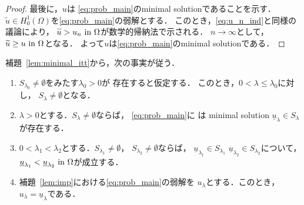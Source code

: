 \begin{proof}
 最後に，$u$は
 \ref{eq:prob_main}のminimal solutionであることを示す．
 $\tilde{u} \in H_0^1(\Omega)$を\ref{eq:prob_main}の弱解とする．
 このとき，\eqref{eq:u_n_ind}と同様の議論により，
 $\widetilde{u} > u_n ~\text{in}~ \Omega$が数学的帰納法で示される．
 $n \to \infty$として，$\widetilde{u} \geq u ~\text{in}~ \Omega$となる．
 よって$u$は\ref{eq:prob_main}のminimal solutionである．\qedhere
\end{proof}

補題~\ref{lem:minimal_itt}から，次の事実が従う．

\begin{lem} \label{lem:minimal_va}
 \begin{enumerate}[1.] \sage
  \item $S_{\lambda_0} \neq \emptyset$をみたす$\lambda_0 > 0$が
        存在すると仮定する．
        このとき，$0 < \lambda \leq \lambda_0$に対し，
        $S_\lambda \neq \emptyset$となる．
  \item $\lambda > 0$とする．$S_\lambda \neq \emptyset$ならば，
        \ref{eq:prob_main}に
        は minimal solution $\underline{u}_\lambda
        \in S_\lambda$が存在する．
  \item $0 < \lambda_1 < \lambda_2$とする．$S_{\lambda_1} \neq
        \emptyset$，
        $S_{\lambda_2} \neq \emptyset$ならば，
        $\underline{u}_{\lambda_1} \in S_{\lambda_1}$
        $\underline{u}_{\lambda_2} \in S_{\lambda_2}$について，
        $\underline{u}_{\lambda_1} < \underline{u}_{\lambda_2} ~\text{in}~
        \Omega$が成立する．
  \item 補題~\ref{lem:imp}における\ref{eq:prob_main}の弱解を
        $u_\lambda$とする．このとき，$u_\lambda =
        \underline{u}_\lambda$である．
 \end{enumerate}
\end{lem}

